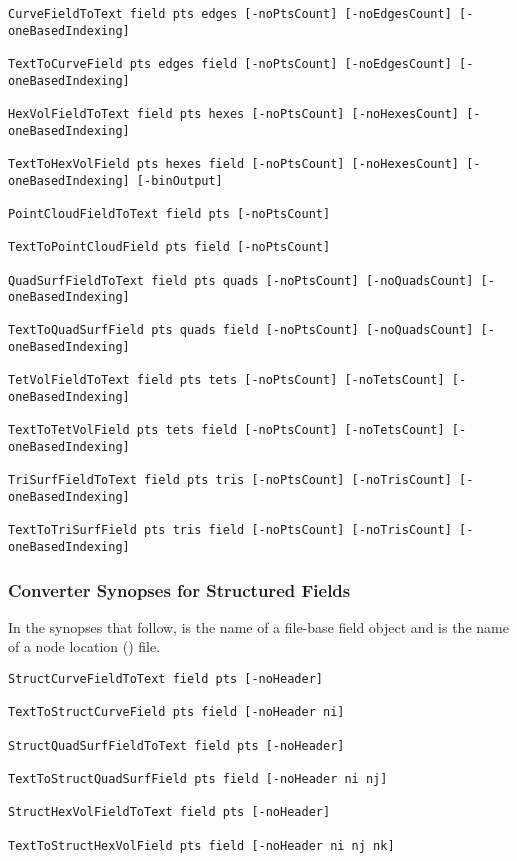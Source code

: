 \begin{verbatim}
CurveFieldToText field pts edges [-noPtsCount] [-noEdgesCount] [-oneBasedIndexing]

TextToCurveField pts edges field [-noPtsCount] [-noEdgesCount] [-oneBasedIndexing]

HexVolFieldToText field pts hexes [-noPtsCount] [-noHexesCount] [-oneBasedIndexing]

TextToHexVolField pts hexes field [-noPtsCount] [-noHexesCount] [-oneBasedIndexing] [-binOutput]

PointCloudFieldToText field pts [-noPtsCount]

TextToPointCloudField pts field [-noPtsCount]

QuadSurfFieldToText field pts quads [-noPtsCount] [-noQuadsCount] [-oneBasedIndexing]

TextToQuadSurfField pts quads field [-noPtsCount] [-noQuadsCount] [-oneBasedIndexing]

TetVolFieldToText field pts tets [-noPtsCount] [-noTetsCount] [-oneBasedIndexing]

TextToTetVolField pts tets field [-noPtsCount] [-noTetsCount] [-oneBasedIndexing]

TriSurfFieldToText field pts tris [-noPtsCount] [-noTrisCount] [-oneBasedIndexing]

TextToTriSurfField pts tris field [-noPtsCount] [-noTrisCount] [-oneBasedIndexing]
\end{verbatim}


\subsubsection{Converter Synopses for Structured Fields}
\label{sec:struct_field_synopses}

In the synopses that follow,  is the name of a \sr{}
file-base field object and  is the name of a node location
() file.

\begin{verbatim}
StructCurveFieldToText field pts [-noHeader]

TextToStructCurveField pts field [-noHeader ni]

StructQuadSurfFieldToText field pts [-noHeader]

TextToStructQuadSurfField pts field [-noHeader ni nj]

StructHexVolFieldToText field pts [-noHeader]

TextToStructHexVolField pts field [-noHeader ni nj nk]

\end{verbatim}

